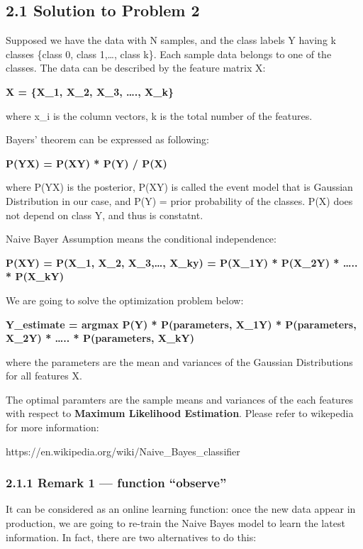 \documentclass{article}
\begin{document}
    \subsection{2.1 Solution to Problem 2}\label{solution-to-problem-2}

Supposed we have the data with N samples, and the class labels Y having
k classes \{class 0, class 1,\ldots{}, class k\}. Each sample data
belongs to one of the classes. The data can be described by the feature
matrix X:

\textbf{X = \{X\_1, X\_2, X\_3, \ldots{}., X\_k\}}

where x\_i is the column vectors, k is the total number of the features.

Bayers' theorem can be expressed as following:

\textbf{P(Y\textbar{}X) = P(X\textbar{}Y) * P(Y) / P(X)}

where P(Y\textbar{}X) is the posterior, P(X\textbar{}Y) is called the
event model that is Gaussian Distribution in our case, and P(Y) = prior
probability of the classes. P(X) does not depend on class Y, and thus is
constatnt.

Naive Bayer Assumption means the conditional independence:

\textbf{P(X\textbar{}Y) = P(X\_1, X\_2, X\_3,\ldots{}, X\_k\textbar{}y)
= P(X\_1\textbar{}Y) * P(X\_2\textbar{}Y) * \ldots{}.. *
P(X\_k\textbar{}Y)}

We are going to solve the optimization problem below:

\textbf{Y\_estimate = argmax P(Y) * P(parameters, X\_1\textbar{}Y) *
P(parameters, X\_2\textbar{}Y) * \ldots{}.. * P(parameters,
X\_k\textbar{}Y)}

where the parameters are the mean and variances of the Gaussian
Distributions for all features X.

The optimal paramters are the sample means and variances of the each
features with respect to \textbf{Maximum Likelihood Estimation}. Please
refer to wikepedia for more information:

https://en.wikipedia.org/wiki/Naive\_Bayes\_classifier

    \subsubsection{2.1.1 Remark 1 --- function
``observe''}\label{remark-1-function-observe}

It can be considered as an online learning function: once the new data
appear in production, we are going to re-train the Naive Bayes model to
learn the latest information. In fact, there are two alternatives to do
this:
\end{document}
